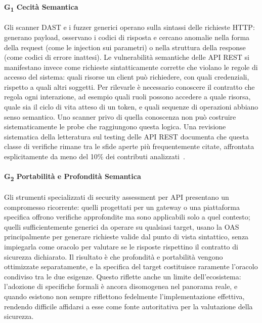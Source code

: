 \paragraph{G\textsubscript{1} Cecità Semantica}\label{g1:cecita-semantica}
Gli scanner \gls{DAST} e i fuzzer generici operano sulla sintassi delle richieste \gls{HTTP}: generano payload, osservano i codici di risposta e cercano anomalie nella forma della request (come le injection sui parametri) o nella struttura della response (come codici di errore inattesi). Le vulnerabilità semantiche delle \gls{API} REST si manifestano invece come richieste sintatticamente corrette che violano le regole di accesso del sistema: quali risorse un client può richiedere, con quali credenziali, rispetto a quali altri soggetti. Per rilevarle è necessario conoscere il contratto che regola ogni interazione, ad esempio quali ruoli possono accedere a quale risorsa, quale sia il ciclo di vita atteso di un token, e quali sequenze di operazioni abbiano senso semantico. Uno scanner privo di quella conoscenza non può costruire sistematicamente le probe che raggiungono questa logica. Una revisione sistematica della letteratura sul testing delle \gls{API} REST documenta che questa classe di verifiche rimane tra le sfide aperte più frequentemente citate, affrontata esplicitamente da meno del 10\% dei contributi analizzati~\cite{golmohammadiTestingRESTfulAPIs2023}.

\paragraph{G\textsubscript{2} Portabilità e Profondità Semantica}\label{g2:portabilita-profondita}
Gli strumenti specializzati di security assessment per \gls{API} presentano un compromesso ricorrente: quelli progettati per un gateway o una piattaforma specifica offrono verifiche approfondite ma sono applicabili solo a quel contesto; quelli sufficientemente generici da operare su qualsiasi target, usano la \gls{OAS} principalmente per generare richieste valide dal punto di vista sintattico, senza impiegarla come oracolo per valutare se le risposte rispettino il contratto di sicurezza dichiarato. Il risultato è che profondità e portabilità vengono ottimizzate separatamente, e la specifica del target costituisce raramente l'oracolo condiviso tra le due esigenze. Questo riflette anche un limite dell'ecosistema: l'adozione di specifiche formali è ancora disomogenea nel panorama reale, e quando esistono non sempre riflettono fedelmente l'implementazione effettiva, rendendo difficile affidarsi a esse come fonte autoritativa per la valutazione della sicurezza.

